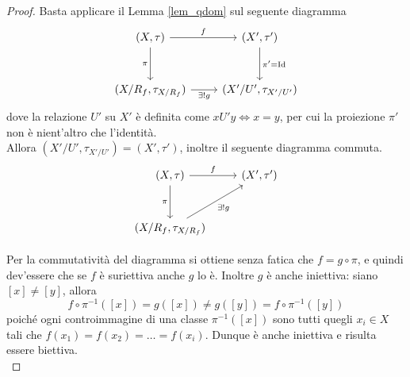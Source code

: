 \begin{proof}
	Basta applicare il Lemma \ref{lem_qdom} sul seguente diagramma
	\begin{equation*}
	\begin{tikzcd}[row sep = 3em]
		(X, \tau) \arrow[swap]{d}{\pi} \arrow{r}{f} & (X', \tau') \arrow{d}{\pi' = \operatorname{Id}}\\
		(X/R_f, \tau_{X/R_f}) \arrow[swap]{r}{\exists! g} & (X'/U', \tau_{X'/U'})
	\end{tikzcd}	
	\end{equation*}
	dove la relazione $U'$ su $X'$ è definita come $xU'y \Leftrightarrow x = y$, per cui la proiezione $\pi'$ non è nient'altro che l'identità. \\ Allora $(X'/U', \tau_{X'/U'}) = (X', \tau')$, inoltre il seguente diagramma commuta. 
	\begin{equation*}
	\begin{tikzcd}[row sep = 3em]
		(X, \tau) \arrow[swap]{d}{\pi} \arrow{r}{f} & (X', \tau') \\
		(X/R_f, \tau_{X/R_f}) \arrow[swap]{ru}{\exists! g} &
	\end{tikzcd}	
	\end{equation*}
	
	Per la commutatività del diagramma si ottiene senza fatica che $f = g \circ \pi$, e quindi dev'essere che se $f$ è suriettiva anche $g$ lo è. Inoltre $g$ è anche iniettiva: siano $\left[x\right] \neq \left[y\right]$, allora 
	\begin{equation*}
		f \circ \pi^{-1} (\left[x\right]) = g(\left[x\right]) \neq g(\left[y\right]) = f \circ \pi^{-1}(\left[y\right])
	\end{equation*}	
	poiché ogni controimmagine di una classe $\pi^{-1}(\left[x\right])$ sono tutti quegli $x_i \in X$ tali che $f(x_1) = f(x_2) = \dots = f(x_i)$. Dunque è anche iniettiva e risulta essere biettiva.\\
	

\end{proof}
